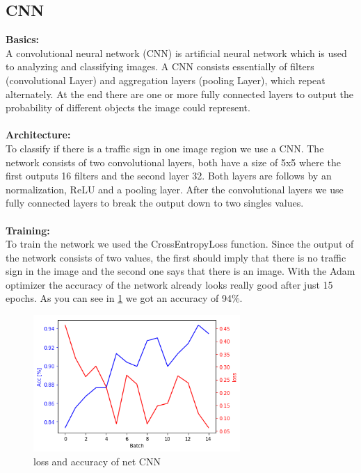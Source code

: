 \documentclass[12pt,a4paper,bibliography=totocnumbered,listof=totocnumbered]{scrartcl}
\begin{document}
\subsection{CNN}

\textbf{Basics:}\\
A convolutional neural network (CNN) is artificial neural network which is used to analyzing and classifying images. A CNN consists essentially of filters (convolutional Layer) and aggregation layers (pooling Layer), which repeat alternately. At the end there are one or more fully connected layers to output the probability of different objects the image could represent.\\\\

\textbf{Architecture:}\\
To classify if there is a traffic sign in one image region we use a CNN. The network consists of two convolutional layers, both have a size of 5x5 where the first outputs 16 filters and the second layer 32. Both layers are follows by an normalization, ReLU and a pooling layer. After the convolutional layers we use fully connected layers to break the output down to two singles values.\\\\

\textbf{Training:}\\
To train the network we used the CrossEntropyLoss function. Since the output of the network consists of two values, the first should imply that there is no traffic sign in the image and the second one says that there is an image. With the Adam optimizer the accuracy of the network already looks really good after just 15 epochs. As you can see in \ref{fig:loss_acc} we got an accuracy of 94\%.

\begin{figure}[htbp] 
  \centering
     \includegraphics[width=0.7\textwidth]{loss_acc}
  \caption{loss and accuracy of net CNN}
  \label{fig:loss_acc}
\end{figure}
\end{document}
